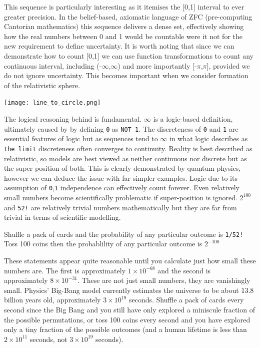 \documentclass[12pt]{article}
\begin{document}
This sequence is particularly interesting as it itemises the [0,1] interval to ever greater precision. In the belief-based, axiomatic language of ZFC (pre-computing Cantorian mathematics) this sequence delivers a dense set, effectively showing how the real numbers between 0 and 1 would be countable were it not for the new requirement to define \qbit{} uncertainty. It is worth noting that since we can demonstrate how to count [0,1] we can use function transformations to count any continuous interval, including (-$\infty$,$\infty$) and more importantly [-$\pi$,$\pi$], provided we do not ignore \qbit{} uncertainty. This becomes important when we consider formation of the \iR{} relativistic sphere.

\texttt{[image: line\_to\_circle.png]}

The logical reasoning behind \qbit{} is fundamental. $\infty$ is a logic-based definition, ultimately caused by by defining \texttt{0} as \texttt{NOT 1}. The discreteness of \texttt{0} and \texttt{1} are essential features of logic but as sequences tend to $\infty$ in what logic describes as \texttt{the limit} discreteness often converges to continuity. Reality is best described as relativistic, so models are best viewed as neither continuous nor discrete but as the super-position of both. This is clearly demonstrated by quantum physics, however we can deduce the issue with far simpler examples. Logic due to its assumption of \texttt{0},\texttt{1} independence can effectively count forever. Even relatively small numbers become scientifically problematic if \qbit{} super-position is ignored. $2^{100}$ and \texttt{52!} are relatively trivial numbers mathematically but they are far from trivial in terms of scientific modelling.

Shuffle a pack of cards and the probability of any particular outcome is \texttt{1/52!}
Toss 100 coins then the probablility of any particular outcome is $2^{-100}$

These statements appear quite reasonable until you calculate just how small these numbers are. The first is approximately $1 \times 10^{-68}$ and the second is approximately $8 \times 10^{-31}$. These are not just small numbers, they are vanishingly small. Physics' Big-Bang model currently estimates the universe to be about 13.8 billion years old, approximately $3 \times 10^{19}$ seconds. Shuffle a pack of cards every second since the Big Bang and you still have only explored a miniscule fraction of the possible permutations, or toss 100 coins every second and you have explored only a tiny fraction of the possible outcomes (and a human lifetime is less than $2 \times 10^{11}$ seconds, not $3 \times 10^{19}$ seconds).
\end{document}
